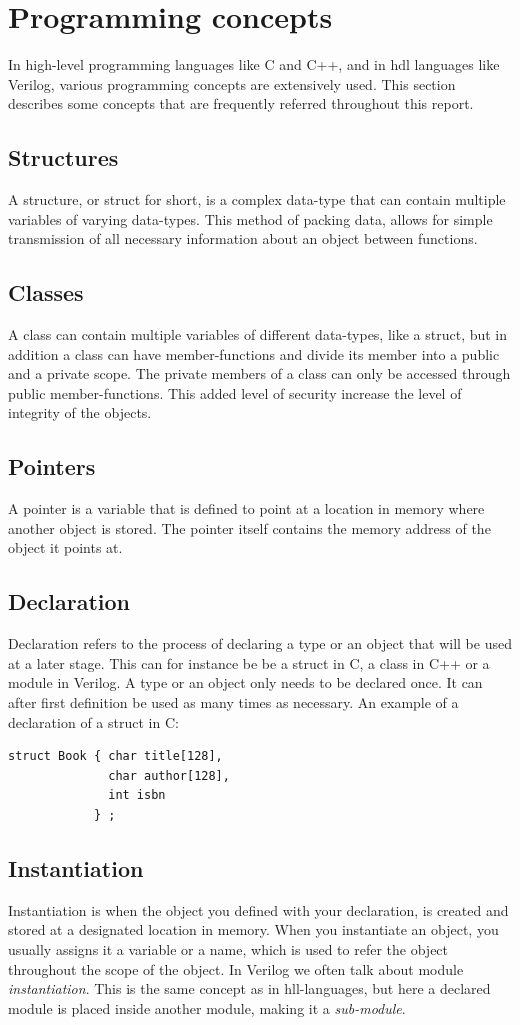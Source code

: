 \section{Programming concepts}
In high-level programming languages like C and C++, and in \gls{hdl} languages like Verilog, various programming concepts are extensively used. This section describes some concepts that are frequently referred throughout this report.
\subsection{Structures}
A structure, or struct for short, is a complex data-type that can contain multiple variables of varying data-types. This method of packing data, allows for simple transmission of all necessary information about an object between functions.
\subsection{Classes}
A class can contain multiple variables of different data-types, like a struct, but in addition a class can have member-functions and divide its member into a public and a private scope. The private members of a class can only be accessed through public member-functions. This added level of security increase the level of integrity of the objects.
\subsection{Pointers}
A pointer is a variable that is defined to point at a location in memory where another object is stored. The pointer itself contains the memory address of the object it points at.
\subsection{Declaration}
Declaration refers to the process of declaring a type or an object that will be used at a later stage. This can for instance be be a struct in C, a class in C++ or a module in Verilog. A type or an object only needs to be declared once. It can after first definition be used as many times as necessary. An example of a declaration of a struct in C: 
\lstset{language=C++, style=Cstyle}
\begin{lstlisting}
struct Book { char title[128], 
              char author[128], 
              int isbn 
            } ;
\end{lstlisting}
\subsection{Instantiation}
Instantiation is when the object you defined with your declaration, is created and stored at a designated location in memory. When you instantiate an object, you usually assigns it a variable or a name, which is used to refer the object throughout the scope of the object. In Verilog we often talk about module \textit{instantiation}. This is the same concept as in \gls{hll}-languages, but here a declared module is placed inside another module, making it a \textit{sub-module}.
